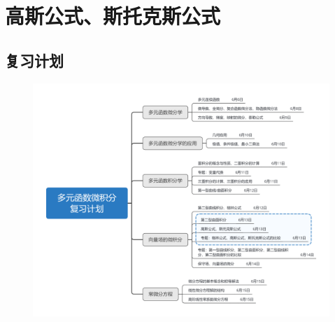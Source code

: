 \documentclass[12pt,UTF8,fleqn]{ctexart}
\begin{document}
\setcounter{section}{11}
\section{高斯公式、斯托克斯公式}
\noindent
\subsection{复习计划}
\begin{figure}[H]
\begin{center}
\includegraphics[height=0.5\textheight]{Figures20190613/plan.png}
\end{center}
\end{figure}
\end{document}
